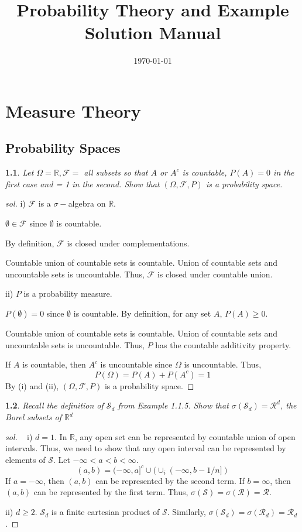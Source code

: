 \documentclass{report}
\newtheorem{ex}{}[section]
\newcommand\frontmatter{%
    \clearpage
  \pagenumbering{roman}}
\newcommand\mainmatter{%
    \clearpage
  \pagenumbering{arabic}}
\begin{document}
\title{Probability Theory and Example Solution Manual}
\author{}
\date{\today}
\maketitle

\frontmatter
\tableofcontents
\mainmatter

\chapter{Measure Theory}
\section{Probability Spaces}
\begin{ex}
Let $\Omega = \mathbb{R}, \mathcal{F} =$ all subsets so that $A$ or $A^c$ is countable, $P(A) = 0$ in the first case and = 1 in the second. Show that $(\Omega, \mathcal{F}, P)$ is a probability space.
\end{ex}
\begin{proof}[sol]
i) $\mathcal{F}$ is a $\sigma-$algebra on $\mathbb{R}$.

$\emptyset \in \mathcal{F}$ since $\emptyset$ is countable.

By definition, $\mathcal{F}$ is closed under complementations.

Countable union of countable sets is countable.  Union of countable sets and uncountable sets is uncountable. Thus, $\mathcal{F}$ is closed under countable union. 

ii) $P$ is a probability measure.

$P(\emptyset) = 0$ since $\emptyset$ is countable. By definition, for any set $A$, $P(A) \ge 0$.

Countable union of countable sets is countable.  Union of countable sets and uncountable sets is uncountable. Thus, $P$ has the countable additivity property. 

If $A$ is countable, then $A^c$ is uncountable since $\Omega$ is uncountable. Thus,
\[P(\Omega) = P(A) + P(A^c) = 1\]
By (i) and (ii), $(\Omega, \mathcal{F}, P)$ is a probability space.
\end{proof}
\begin{ex}
Recall the definition of $\mathcal{S}_d$ from Example 1.1.5. Show that $\sigma (\mathcal{S}_d) =\mathcal{R}^d$, the Borel subsets of $\mathbb{R}^d$
\end{ex}
\begin{proof}[sol]~
i) $d = 1$. In $\mathbb{R}$, any open set can be represented by countable union of open intervals. Thus, we need to show that any open interval can be represented by elements of $\mathcal{S}$. Let $-\infty < a <  b < \infty$.
\[(a,b) = (-\infty, a]^c \cup (\cup_i(-\infty, b - 1/n])\]
If $a = -\infty$, then $(a,b)$ can be represented by the second term. If $b =  \infty$, then $(a,b)$ can be represented by the first term. Thus, $\sigma(\mathcal{S}) = \sigma(\mathcal{R}) = \mathcal{R}$.

ii) $d \ge 2$. $\mathcal{S}_d$ is a finite cartesian product of $\mathcal{S}$. Similarly, $\sigma(\mathcal{S}_d) = \sigma(\mathcal{R}_d) = \mathcal{R}_d$.
\end{proof}
\end{document}
